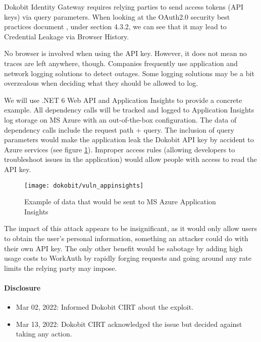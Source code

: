 Dokobit Identity Gateway requires {relying parties} to send access tokens (API keys) via query parameters. When looking at the OAuth2.0 security best practices document \cite{ietf-oauth-security-topics-19}, under section 4.3.2, we can see that it may lead to Credential Leakage via Browser History.

No browser is involved when using the API key. However, it does not mean no traces are left anywhere, though. Companies frequently use application and network logging solutions to detect outages. Some logging solutions may be a bit overzealous when deciding what they should be allowed to log.

We will use .NET 6 Web API and Application Insights to provide a concrete example. All dependency calls will be tracked and logged to Application Insights log storage on MS Azure with an out-of-the-box configuration. The data of dependency calls include the request path + query. The inclusion of query parameters would make the application leak the Dokobit API key by accident to Azure services (see figure \ref{fig:dokobit-vuln-query}). Improper access rules (allowing developers to troubleshoot issues in the application) would allow people with access to read the API key.

\begin{figure}
  \centering
  \texttt{[image: dokobit/vuln\_appinsights]}
  \caption{Example of data that would be sent to MS Azure Application Insights}
  \label{fig:dokobit-vuln-query}
\end{figure}

The impact of this attack appears to be insignificant, as it would only allow users to obtain the user's personal information, something an attacker could do with their own API key. The only other benefit would be sabotage by adding high usage costs to WorkAuth by rapidly forging requests and going around any rate limits the relying party may impose.

\paragraph{Disclosure}

\begin{itemize}
  \item Mar 02, 2022: Informed Dokobit CIRT about the exploit.
  \item Mar 13, 2022: Dokobit CIRT acknowledged the issue but decided against taking any action.
\end{itemize}

